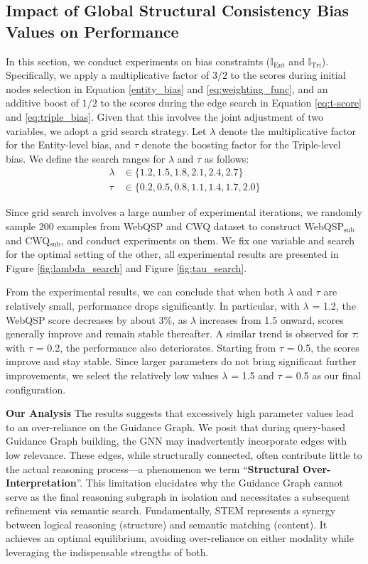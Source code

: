 \documentclass[11pt]{article}
\begin{document}
\subsection{Impact of Global Structural Consistency Bias Values on Performance}
\label{eq:gscb_param}
In this section, we conduct experiments on bias constraints ($\mathbb{I}_\text{Ent}$ and $\mathbb{I}_\text{Tri}$). Specifically, we apply a multiplicative factor of $3/2$ to the scores during initial nodes selection in Equation \ref{entity_bias} and \ref{eq:weighting_func}, and an additive boost of $1/2$ to the scores during the edge search in Equation \ref{eq:t-score} and \ref{eq:triple_bias}. Given that this involves the joint adjustment of two variables, we adopt a grid search strategy. Let $\lambda$ denote the multiplicative factor for the Entity-level bias, and $\tau$ denote the boosting factor for the Triple-level bias. We define the search ranges for $\lambda$ and $\tau$ as follows:
\begin{align}
\lambda &\in \{1.2, 1.5, 1.8, 2.1, 2.4, 2.7 \} \\
\tau &\in \{0.2, 0.5, 0.8, 1.1, 1.4, 1.7, 2.0 \}
\label{eq:param_range}
\end{align} 

Since grid search involves a large number of experimental iterations, we randomly sample 200 examples from WebQSP and CWQ dataset to construct WebQSP$_\text{sub}$ and CWQ$_\text{sub}$, and conduct experiments on them. We fix one variable and search for the optimal setting of the other, all experimental results are presented in Figure \ref{fig:lambda_search} and Figure \ref{fig:tau_search}.

From the experimental results, we can conclude that when both $\lambda$ and $\tau$ are relatively small, performance drops significantly. In particular, with $\lambda$ = 1.2, the WebQSP score decreases by about 3\%, as $\lambda$ increases from 1.5 onward, scores generally improve and remain stable thereafter. A similar trend is observed for $\tau$: with $\tau$ = 0.2, the performance also deteriorates. Starting from $\tau$ = 0.5, the scores improve and stay stable. Since larger parameters do not bring significant further improvements, we select the relatively low values $\lambda$ = 1.5 and $\tau$ = 0.5 as our final configuration.

\textbf{Our Analysis} The results suggests that excessively high parameter values lead to an over-reliance on the Guidance Graph. We posit that during query-based Guidance Graph building, the GNN may inadvertently incorporate edges with low relevance. These edges, while structurally connected, often contribute little to the actual reasoning process—a phenomenon we term ``\textbf{Structural Over-Interpretation}''. This limitation elucidates why the Guidance Graph cannot serve as the final reasoning subgraph in isolation and necessitates a subsequent refinement via semantic search. Fundamentally, STEM represents a synergy between logical reasoning (structure) and semantic matching (content). It achieves an optimal equilibrium, avoiding over-reliance on either modality while leveraging the indispensable strengths of both.
\end{document}
